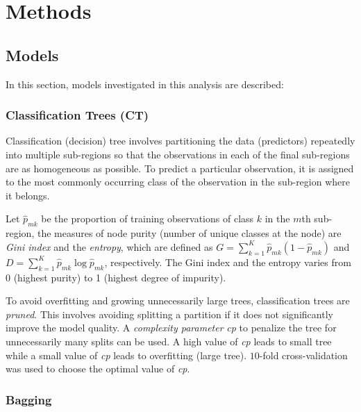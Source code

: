 \clearpage
\section{Methods}

\subsection{Models}
In this section, models investigated in this analysis are described:

\subsubsection{Classification Trees (CT)}

Classification (decision) tree involves partitioning the data (predictors) repeatedly into multiple sub-regions so that the observations in each of the final sub-regions are as homogeneous as possible. To predict a particular observation, it is assigned to the most commonly occurring class of the observation in the sub-region where it belongs. 

\noindent Let $\hat{p}_{mk}$ be the proportion of training observations of class $k$ in the $m$th sub-region, the measures of node purity (number of unique classes at the node) are \textit{Gini index} and the \textit{entropy}, which are defined as $G = \sum_{k=1}^K\hat{p}_{mk}(1-\hat{p}_{mk})$ and $D = \sum_{k=1}^K\hat{p}_{mk}\log \hat{p}_{mk}$, respectively. The Gini index and the entropy varies from 0 (highest purity) to 1 (highest degree of impurity). 

\noindent To avoid overfitting and growing unnecessarily large trees, classification trees are \textit{pruned}. This involves avoiding splitting a partition if it does not significantly improve the model quality. A \textit{complexity parameter} \textit{cp} to penalize the tree for  unnecessarily many splits can be used. A high value of \textit{cp} leads to small tree while a small value of \textit{cp} leads to overfitting (large tree). $10$-fold cross-validation was used to choose the optimal value of \textit{cp}. 

\subsubsection{Bagging}

